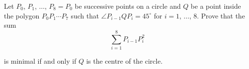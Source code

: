Let $P_0$,  $P_1$,  $\dots$,  $P_8 = P_0$ be successive points on a circle and $Q$ be a point inside the polygon $P_0 P_1 \dotsb P_7$ such that $\angle P_{i - 1} QP_i = 45^\circ$ for $i = 1$,  $\dots$,  8.  Prove that the sum\[\sum_{i = 1}^8 P_{i - 1} P_i^2\]

is minimal if and only if $Q$ is the centre of the circle.